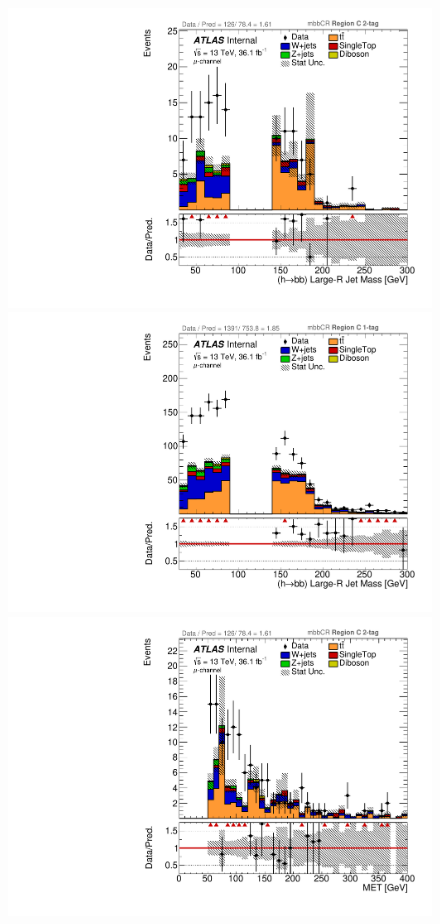 \begin{figure}[!htbp]
\begin{center}
\includegraphics[scale=0.23]{./figures/boosted/ABCD/muon_mbbcr_RegionC_HbbMass}
\includegraphics[scale=0.23]{./figures/boosted/ABCD/muon_mbbcr_RegionC_1tag_HbbMass}\\
\includegraphics[scale=0.23]{./figures/boosted/ABCD/muon_mbbcr_RegionC_MET}

\end{center}
\end{figure}

